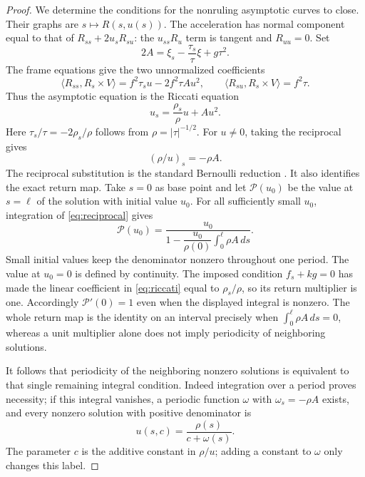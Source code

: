 \documentclass[11pt]{amsart}
\theoremstyle{definition}
\begin{document}
\begin{proof}
We determine the conditions for the nonruling asymptotic curves to
close. Their graphs are $s\mapsto R(s,u(s))$.
The acceleration has normal component equal to that of
$R_{ss}+2u_sR_{su}$: the $u_{ss}R_u$ term is tangent and
$R_{uu}=0$. Set
\[
 2A=\xi_s-\frac{\tau_s}{\tau}\xi+g\tau^2 .
\]
The frame equations give the two unnormalized coefficients
\[
 \langle R_{ss},R_s\times V\rangle
     =f^2\tau_su-2f^2\tau Au^2,\qquad
 \langle R_{su},R_s\times V\rangle=f^2\tau.
\]
Thus the asymptotic equation is the Riccati equation
\begin{equation}\label{eq:riccati}
 u_s=\frac{\rho_s}{\rho}u+Au^2.
\end{equation}
Here $\tau_s/\tau=-2\rho_s/\rho$ follows from
$\rho=|\tau|^{-1/2}$. For $u\ne0$, taking the reciprocal gives
\begin{equation}\label{eq:reciprocal}
 (\rho/u)_s=-\rho A.
\end{equation}
The reciprocal substitution is the standard Bernoulli reduction
\cite[\S1.4]{Teschl}. It also identifies the exact return map.
Take $s=0$ as base point and let $\mathcal P(u_0)$ be the value
at $s=\ell$ of the solution with initial value $u_0$.
For all sufficiently small $u_0$, integration of
\eqref{eq:reciprocal} gives
\begin{equation}\label{eq:return-map}
 \mathcal P(u_0)=
 \frac{u_0}{1-\dfrac{u_0}{\rho(0)}
                      \int_0^\ell\rho A\,ds}.
\end{equation}
Small initial values keep the denominator nonzero throughout
one period. The value at $u_0=0$ is defined by continuity.
The imposed condition $f_s+kg=0$ has made the linear coefficient
in \eqref{eq:riccati} equal to $\rho_s/\rho$, so its return
multiplier is one. Accordingly $\mathcal P'(0)=1$ even when
the displayed integral is nonzero.
The whole return map is the identity on an interval precisely
when $\int_0^\ell\rho A\,ds=0$, whereas a unit multiplier
alone does not imply periodicity of neighboring solutions.

It follows that periodicity of the neighboring nonzero solutions
is equivalent to that single remaining integral condition. Indeed integration over a period proves
necessity; if this integral vanishes, a periodic function $\omega$
with $\omega_s=-\rho A$ exists, and every nonzero solution with
positive denominator is
\begin{equation}\label{eq:leaves}
 u(s,c)=\frac{\rho(s)}{c+\omega(s)}.
\end{equation}
The parameter $c$ is the additive constant in $\rho/u$; adding a
constant to $\omega$ only changes this label.


\end{proof}
\end{document}
